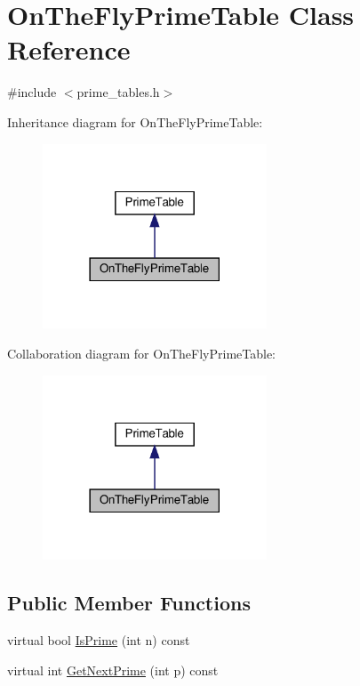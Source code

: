 \hypertarget{class_on_the_fly_prime_table}{}\section{On\+The\+Fly\+Prime\+Table Class Reference}
\label{class_on_the_fly_prime_table}


{\ttfamily \#include $<$prime\+\_\+tables.\+h$>$}



Inheritance diagram for On\+The\+Fly\+Prime\+Table\+:
\nopagebreak
\begin{figure}[H]
\begin{center}
\leavevmode
\includegraphics[width=189pt]{class_on_the_fly_prime_table__inherit__graph}
\end{center}
\end{figure}


Collaboration diagram for On\+The\+Fly\+Prime\+Table\+:
\nopagebreak
\begin{figure}[H]
\begin{center}
\leavevmode
\includegraphics[width=189pt]{class_on_the_fly_prime_table__coll__graph}
\end{center}
\end{figure}
\subsection*{Public Member Functions}
\begin{DoxyCompactItemize}
\item 
virtual bool \hyperlink{class_on_the_fly_prime_table_a1d49b78f79e018441289e79d75680067}{Is\+Prime} (int n) const
\item 
virtual int \hyperlink{class_on_the_fly_prime_table_a5a4644fedd95d33136723f33b9302bfc}{Get\+Next\+Prime} (int p) const
\end{DoxyCompactItemize}


